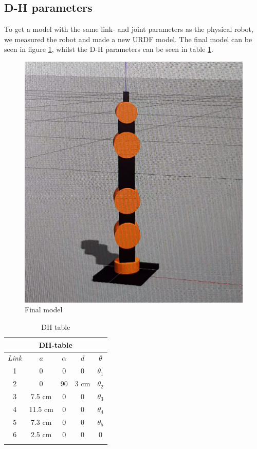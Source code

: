 \documentclass[11pt,a4paper, titlepage]{article}
\begin{document}
	\subsection{D-H parameters}
	To get a model with the same link- and joint parameters as the physical robot, we measured the robot and made a new URDF model. The final model can be seen in figure \ref{fig:urdf-final}, whilst the D-H parameters can be seen in table \ref{DH-table}.
	
	\begin{figure}[H]
		\centering
		\includegraphics[width=0.7\linewidth]{../Diagrams/URDF-final.png}
		
		\caption{Final model}
		\label{fig:urdf-final}
	\end{figure}
	
	\newpage	
		
	\begin{center}           
    \begin{longtable}{| c | c | c | c | c |}
              \hline
                       
\multicolumn{5}{|c|}{\textbf{DH-table}} \\ \hline \endhead
\textit{Link} & \textbf{$a$} & \textbf{$\alpha$} & $d$ & \textbf{$\theta$} \\ \hline             
               1 & 0 & 0 &  0 & $\theta_1$ \\ \hline
               2 & 0 & 90 & 3 cm & $\theta_2$ \\ \hline
               3 & 7.5 cm & 0 & 0 & $\theta_3$ \\ \hline
               4 & 11.5 cm & 0 & 0 & $\theta_4$ \\ \hline
               5 & 7.3 cm & 0 & 0 & $\theta_5$ \\ \hline
               6 & 2.5 cm & 0 & 0 & 0 \\ \hline
               
\caption{DH table}
\label{DH-table}                                       
\end{longtable}
\end{center}
\end{document}
